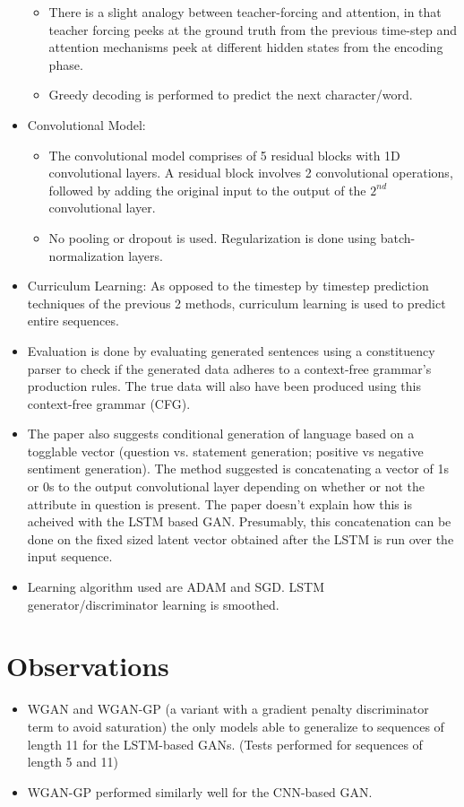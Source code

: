 \documentclass[12pt]{scrartcl}
\begin{document}
\begin{itemize}
\begin{itemize}
        \item There is a slight analogy between teacher-forcing and attention, in that teacher forcing peeks at the ground truth from the previous time-step and attention mechanisms peek at different hidden states from the encoding phase.
        \item Greedy decoding is performed to predict the next character/word.
      \end{itemize}
    \item Convolutional Model:
      \begin{itemize}
        \item The convolutional model comprises of 5 residual blocks with 1D convolutional layers. A residual block involves 2 convolutional operations, followed by adding the original input to the output of the $2^{nd}$ convolutional layer.
        \item No pooling or dropout is used. Regularization is done using batch-normalization layers.
      \end{itemize}
    \item Curriculum Learning: As opposed to the timestep by timestep prediction techniques of the previous 2 methods, curriculum learning is used to predict entire sequences. \cite{bengio2009curriculum}
    \item Evaluation is done by evaluating generated sentences using a constituency parser to check if the generated data adheres to a context-free grammar's production rules. The true data will also have been produced using this context-free grammar (CFG).
    \item The paper also suggests conditional generation of language based on a togglable vector (question vs. statement generation; positive vs negative sentiment generation). The method suggested is concatenating a vector of 1s or 0s to the output convolutional layer depending on whether or not the attribute in question is present. The paper doesn't explain how this is acheived with the LSTM based GAN. Presumably, this concatenation can be done on the fixed sized latent vector obtained after the LSTM is run over the input sequence.
    \item Learning algorithm used are ADAM and SGD. LSTM generator/discriminator learning is smoothed.
  \end{itemize}

\section{Observations}
  \begin{itemize}
    \item WGAN and WGAN-GP (a variant with a gradient penalty discriminator term to avoid saturation) the only models able to generalize to sequences of length 11 for the LSTM-based GANs. (Tests performed for sequences of length 5 and 11)
    \item WGAN-GP performed similarly well for the CNN-based GAN.
  \end{itemize}



\end{document}
